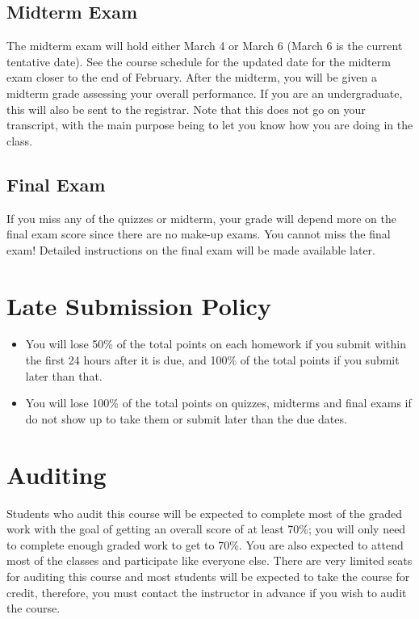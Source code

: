 \documentclass[11pt, a4paper]{article}
\begin{document}
\subsection{Midterm Exam}
The midterm exam will hold either March 4 or March 6 (March 6 is the current tentative date). See the course schedule for the updated date for the midterm exam closer to the end of February. After the midterm, you will be given a midterm grade assessing your overall performance. If you are an undergraduate, this will also be sent to the registrar. Note that this does not go on your transcript, with the main purpose being to let you know how you are doing in the class.

\subsection{Final Exam}
If you miss any of the quizzes or midterm, your grade will depend more on the final exam score since there are no make-up exams. You cannot miss the final exam! Detailed instructions on the final exam will be made available later.


\section{Late Submission Policy} 
\begin{itemize}
	\item  You will lose 50\% of the total points on each homework if you submit within the first 24 hours after it is due, and 100\% of the total points if you submit later than that.
	\item You will lose 100\% of the total points on quizzes, midterms and final exams if do not show up to take them or submit later than the due dates.
\end{itemize}


\section{Auditing}
Students who audit this course will be expected to complete most of the graded work with the goal of getting an overall score of at least 70\%; you will only need to complete enough graded work to get to 70\%. You are also expected to attend most of the classes and participate like everyone else. There are very limited seats for auditing this course and most students will be expected to take the course for credit, therefore, you must contact the instructor in advance if you wish to audit the course.
\end{document}
